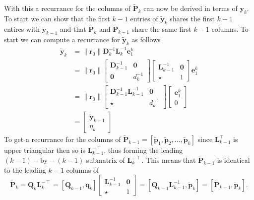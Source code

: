 With this a recurrance for the columns of $\tilde{\bm{P}}_k$ can now be derived in terms of $\bm{y}_k$. To start we can show that the first $k-1$ entries of $\tilde{\bm{y}}_{k}$ shares the first $k-1$ entires with $\tilde{\bm{y}}_{k-1}$ and that $\tilde{\bm{P}}_k$ and $\tilde{\bm{P}}_{k-1}$ share the same first $k-1$ columns. To start we can compute a recurrance for $\tilde{\bm{y}}_{k}$ as follows
\begin{align*}
    \tilde{\bm{y}}_{k} & = \| \bm{r}_0 \| \bm{D}_k^{-1} \bm{L}_k^{-1} \bm{e}_1^k \\
                       & = \| \bm{r}_0 \|
    \begin{bmatrix}
        \bm{D}_{k-1}^{-1} & \bm{0}   \\
        \bm{0}            & d_k^{-1}
    \end{bmatrix}
    \begin{bmatrix}
        \bm{L}_{k-1}^{-1} & \bm{0} \\
        \star             & 1
    \end{bmatrix}
    \bm{e}_1^k                                                                   \\
                       & = \| \bm{r}_0 \|
    \begin{bmatrix}
        \bm{D}_{k-1}^{-1} \bm{L}_{k-1}^{-1} & \bm{0}   \\
        \star                               & d_k^{-1}
    \end{bmatrix}
    \begin{bmatrix}
        \bm{e}_1^k \\
        0
    \end{bmatrix}                                                   \\
                       & =
    \begin{bmatrix}
        \tilde{\bm{y}}_{k-1} \\
        \eta_k
    \end{bmatrix}
\end{align*}
To get a recurrance for the columns of $\tilde{\bm{P}}_{k-1} = \left[ \tilde{\bm{p}}_1 , \tilde{\bm{p}}_2 , \ldots , \tilde{\bm{p}}_k \right]$ since $\bm{L}_{k-1}^{\intercal}$ is upper triangular then so is $\bm{L}_{k-1}^{-\intercal}$, thus forming the leading $(k-1)-\text{by}-(k-1)$ submatrix of $\bm{L}_{k}^{-\intercal}$. This means that $\tilde{\bm{P}}_{k-1}$ is identical to the leading $k-1$ columns of
\[
    \tilde{\bm{P}}_{k} = \bm{Q}_k \bm{L}_k^{-\intercal} = \left[ \bm{Q}_{k-1} , \bm{q}_k \right]
    \begin{bmatrix}
        \bm{L}_{k-1}^{-1} & \bm{0} \\
        \star             & 1
    \end{bmatrix}
    = \left[ \bm{Q}_{k-1} \bm{L}_{k-1}^{-1} , \tilde{\bm{p}}_{k} \right]
    = \left[ \tilde{\bm{P}}_{k-1} , \tilde{\bm{p}}_{k} \right].
\]
